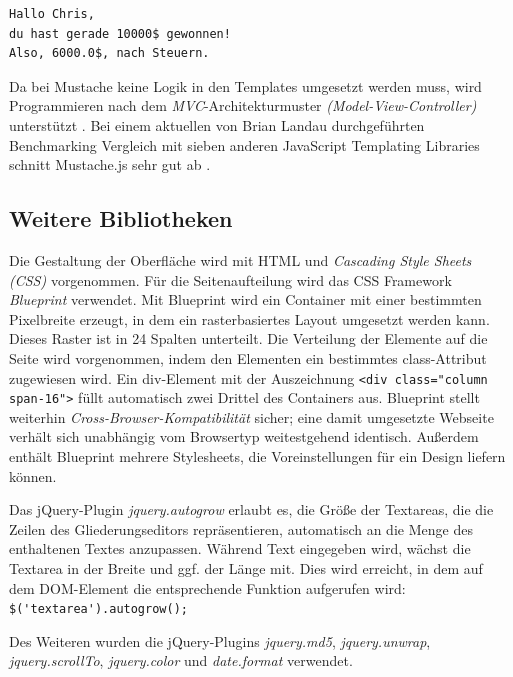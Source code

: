 \medskip
\begin{lstlisting}[caption=Mustache.js: Ergebnis]
Hallo Chris,
du hast gerade 10000$ gewonnen!
Also, 6000.0$, nach Steuern.
\end{lstlisting}

Da bei Mustache keine Logik in den Templates umgesetzt werden muss, wird Programmieren nach dem \textit{MVC}-Architekturmuster \textit{(Model-View-Controller)} unterstützt \cite{mustache:couchio}. Bei einem aktuellen von Brian Landau durchgeführten Benchmarking Vergleich mit sieben anderen JavaScript Templating Libraries schnitt Mustache.js sehr gut ab \cite{mustache:bench}.




\subsection{Weitere Bibliotheken}

Die Gestaltung der Oberfläche wird mit HTML und \textit{Cascading Style Sheets (CSS)} vorgenommen. Für die Seitenaufteilung wird das CSS Framework \textit{Blueprint} \cite{blueprint:website} verwendet. Mit Blueprint wird ein Container mit einer bestimmten Pixelbreite erzeugt, in dem ein rasterbasiertes Layout umgesetzt werden kann. Dieses Raster ist in 24 Spalten unterteilt. Die Verteilung der Elemente auf die Seite wird vorgenommen, indem den Elementen ein bestimmtes {\selectfont class}-Attribut zugewiesen wird. Ein {\selectfont div}-Element mit der Auszeichnung \lstinline!<div class="column span-16">! füllt automatisch zwei Drittel des Containers aus. Blueprint stellt weiterhin \textit{Cross-Browser-Kompatibilität} sicher; eine damit umgesetzte Webseite verhält sich unabhängig vom Browsertyp weitestgehend identisch. Außerdem enthält Blueprint mehrere Stylesheets, die Voreinstellungen für ein Design liefern können.

Das jQuery-Plugin \textit{jquery.autogrow} \cite{jquery:autogrow} erlaubt es, die Größe der Textareas, die die Zeilen des Gliederungseditors repräsentieren, automatisch an die Menge des enthaltenen Textes anzupassen. Während Text eingegeben wird, wächst die Textarea in der Breite und ggf. der Länge mit. Dies wird erreicht, in dem auf dem DOM-Element die entsprechende Funktion aufgerufen wird: \lstinline!$('textarea').autogrow();! 

Des Weiteren wurden die jQuery-Plugins \textit{jquery.md5}, \textit{jquery.unwrap}, \textit{jquery.scrollTo}, \textit{jquery.color} und \textit{date.format} verwendet.











